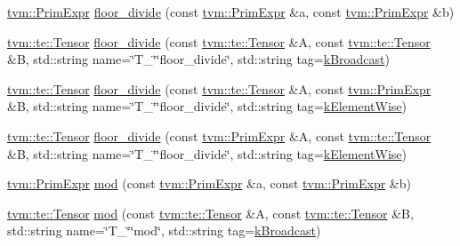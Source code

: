 \begin{DoxyCompactItemize}
\item 
\hyperlink{classtvm_1_1PrimExpr}{tvm\+::\+Prim\+Expr} \hyperlink{namespacetopi_a3927c7edf09081a9520e0d628b3cff5a}{floor\+\_\+divide} (const \hyperlink{classtvm_1_1PrimExpr}{tvm\+::\+Prim\+Expr} \&a, const \hyperlink{classtvm_1_1PrimExpr}{tvm\+::\+Prim\+Expr} \&b)
\item 
\hyperlink{classtvm_1_1te_1_1Tensor}{tvm\+::te\+::\+Tensor} \hyperlink{namespacetopi_a953e84d36db651582dfc937503977ab6}{floor\+\_\+divide} (const \hyperlink{classtvm_1_1te_1_1Tensor}{tvm\+::te\+::\+Tensor} \&A, const \hyperlink{classtvm_1_1te_1_1Tensor}{tvm\+::te\+::\+Tensor} \&B, std\+::string name=\char`\"{}T\+\_\+\char`\"{}\char`\"{}floor\+\_\+divide\char`\"{}, std\+::string tag=\hyperlink{namespacetopi_a794b9155e9ba9d1c9c42a1cff1fb645f}{k\+Broadcast})
\item 
\hyperlink{classtvm_1_1te_1_1Tensor}{tvm\+::te\+::\+Tensor} \hyperlink{namespacetopi_a2b87ca19eaf119df8ba4706311896e59}{floor\+\_\+divide} (const \hyperlink{classtvm_1_1te_1_1Tensor}{tvm\+::te\+::\+Tensor} \&A, const \hyperlink{classtvm_1_1PrimExpr}{tvm\+::\+Prim\+Expr} \&B, std\+::string name=\char`\"{}T\+\_\+\char`\"{}\char`\"{}floor\+\_\+divide\char`\"{}, std\+::string tag=\hyperlink{namespacetopi_ac1b34ed59d38a5f5338bee6b2cad42be}{k\+Element\+Wise})
\item 
\hyperlink{classtvm_1_1te_1_1Tensor}{tvm\+::te\+::\+Tensor} \hyperlink{namespacetopi_a2d719758884cddb6a8ec9c96652364d2}{floor\+\_\+divide} (const \hyperlink{classtvm_1_1PrimExpr}{tvm\+::\+Prim\+Expr} \&A, const \hyperlink{classtvm_1_1te_1_1Tensor}{tvm\+::te\+::\+Tensor} \&B, std\+::string name=\char`\"{}T\+\_\+\char`\"{}\char`\"{}floor\+\_\+divide\char`\"{}, std\+::string tag=\hyperlink{namespacetopi_ac1b34ed59d38a5f5338bee6b2cad42be}{k\+Element\+Wise})
\item 
\hyperlink{classtvm_1_1PrimExpr}{tvm\+::\+Prim\+Expr} \hyperlink{namespacetopi_ab32a7a76e3a94a1edba52436a1337cb6}{mod} (const \hyperlink{classtvm_1_1PrimExpr}{tvm\+::\+Prim\+Expr} \&a, const \hyperlink{classtvm_1_1PrimExpr}{tvm\+::\+Prim\+Expr} \&b)
\item 
\hyperlink{classtvm_1_1te_1_1Tensor}{tvm\+::te\+::\+Tensor} \hyperlink{namespacetopi_a2143f0a5c559d79ee01ec4272d0bab51}{mod} (const \hyperlink{classtvm_1_1te_1_1Tensor}{tvm\+::te\+::\+Tensor} \&A, const \hyperlink{classtvm_1_1te_1_1Tensor}{tvm\+::te\+::\+Tensor} \&B, std\+::string name=\char`\"{}T\+\_\+\char`\"{}\char`\"{}mod\char`\"{}, std\+::string tag=\hyperlink{namespacetopi_a794b9155e9ba9d1c9c42a1cff1fb645f}{k\+Broadcast})

\end{DoxyCompactItemize}
